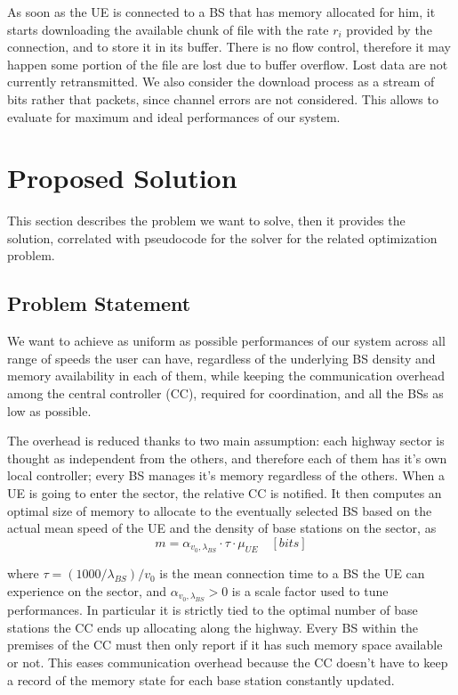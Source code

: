 \documentclass[conference,10pt]{IEEEtran}
\begin{document}
 As soon as the UE is connected to a BS that has memory allocated for him, it starts downloading the available chunk of file with the rate $r_i$ provided by the connection, and to store it in its buffer. There is no flow control, therefore it may happen some portion of the file are lost due to buffer overflow. Lost data are not currently retransmitted. We also consider the download process as a stream of bits rather that packets, since channel errors are not considered. This allows to evaluate for maximum and ideal performances of our system.
 
\section{Proposed Solution}
 
This section describes the problem we want to solve, then it provides the solution, correlated with pseudocode for the solver for the related optimization problem.

\subsection{Problem Statement}

We want to achieve as uniform as possible performances of our system across all range of speeds the user can have, regardless of the underlying BS density and memory availability in each of them, while keeping the communication overhead among the central controller (CC), required for coordination, and all the BSs as low as possible. 

The overhead is reduced thanks to two main assumption: each highway sector is thought as independent from the others, and therefore each of them has it's own local controller; every BS manages it's memory regardless of the others. When a UE is going to enter the sector, the relative CC is notified. It then computes an optimal size of memory to allocate to the eventually selected BS based on the actual mean speed of the UE and the density of base stations on the sector, as
\begin{equation}
m = \alpha_{v_0, \lambda_{B\!S}} \cdot \tau \cdot \mu_{U\!E} \quad [bits]
\end{equation}

where $\tau = (1000/\lambda_{B\!S})/v_0$ is the mean connection time to a BS the UE can experience on the sector, and $\alpha_{v_0, \lambda_{B\!S}} > 0$ is a scale factor used to tune performances. In particular it is strictly tied to the optimal number of base stations the CC ends up allocating along the highway. Every BS within the premises of the CC must then only report if it has such memory space available or not. This eases communication overhead because the CC doesn't have to keep a record of the memory state for each base station constantly updated.
\end{document}
